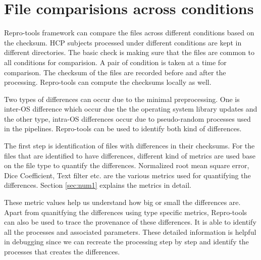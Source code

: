 \section{File comparisions across conditions}
Repro-tools framework can compare the files across different conditions based on the checksum. HCP subjects processed under different conditions are kept in different directories. The basic check is making sure that the files are common to all conditions for comparision. A pair of condition is taken at a time for comparison. The checksum of the files are recorded before and after the processing. Repro-tools can compute the checksums locally as well. 

Two types of differences can occur due to the minimal preprocessing. One is inter-OS difference which occur due the the operating system library updates and the other type, intra-OS differences occur due to pseudo-random processes used in the pipelines. Repro-tools can be used to identify both kind of differences.

The first step is identification of files with differences in their checksums. For the files that are identified to have differences, different kind of metrics are used base on the file type to quantify the differences. Normalized root mean square error, Dice Coefficient, Text filter etc. are the various metrics used for quantifying the differences. Section \ref{sec:num1} explains the metrics in detail. 

These metric values help us understand how big or small the differences are. Apart from quanitfying the differences using type specific metrics, Repro-tools can also be used to trace the provenance of these differences. It is able to identify all the processes and associated parameters. These detailed information is helpful in debugging since we can recreate the processing step by step and identify the processes that creates the differences.


